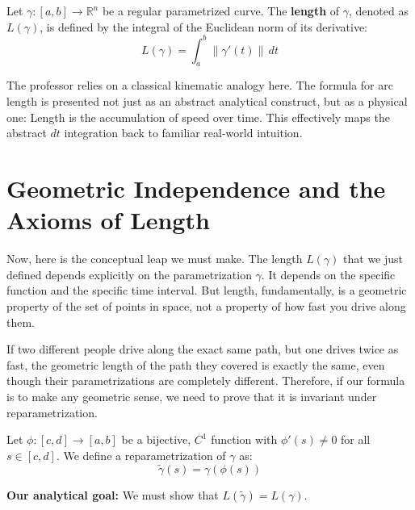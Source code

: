 \begin{orange-formula}
\begin{definition}
Let $\gamma: [a, b] \to \mathbb{R}^n$ be a regular parametrized curve. The \textbf{length} of $\gamma$, denoted as $L(\gamma)$, is defined by the integral of the Euclidean norm of its derivative:
\begin{equation} \label{eq:arc_length}
L(\gamma) = \int_a^b \|\gamma'(t)\| \, dt
\end{equation}
\end{definition}
\end{orange-formula}

\begin{didactic-insight}
The professor relies on a classical kinematic analogy here. The formula for arc length is presented not just as an abstract analytical construct, but as a physical one: Length is the accumulation of speed over time. This effectively maps the abstract $dt$ integration back to familiar real-world intuition.
\end{didactic-insight}


\section{Geometric Independence and the Axioms of Length}

\begin{spoken-clean}[00:07:15 - 00:09:30]
Now, here is the conceptual leap we must make. The length $L(\gamma)$ that we just defined depends explicitly on the parametrization $\gamma$. It depends on the specific function and the specific time interval. But length, fundamentally, is a geometric property of the set of points in space, not a property of how fast you drive along them. 

If two different people drive along the exact same path, but one drives twice as fast, the geometric length of the path they covered is exactly the same, even though their parametrizations are completely different. Therefore, if our formula is to make any geometric sense, we need to prove that it is invariant under reparametrization.
\end{spoken-clean}

\begin{math-stroke}
Let $\phi: [c, d] \to [a, b]$ be a bijective, $C^1$ function with $\phi'(s) \neq 0$ for all $s \in [c, d]$.
We define a reparametrization of $\gamma$ as:
\[
\tilde{\gamma}(s) = \gamma(\phi(s))
\]

\textbf{Our analytical goal:} We must show that $L(\tilde{\gamma}) = L(\gamma)$.
\end{math-stroke}

